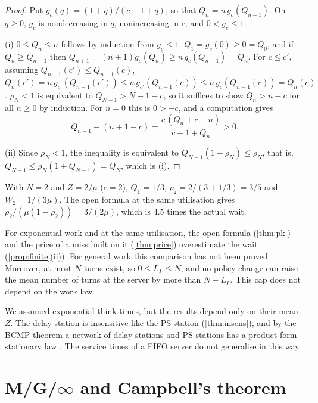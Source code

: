 \begin{proof}
Put $g_c(q)=(1+q)/(c+1+q)$, so that $Q_n=n\,g_c(Q_{n-1})$. On $q\ge0$, $g_c$ is
nondecreasing in $q$, nonincreasing in $c$, and $0<g_c\le1$.

(i) $0\le Q_n\le n$ follows by induction from $g_c\le 1$. $Q_1=g_c(0)\ge0=Q_0$,
and if $Q_n\ge Q_{n-1}$ then $Q_{n+1}=(n+1)g_c(Q_n)\ge n\,g_c(Q_{n-1})=Q_n$.
For $c\le c'$, assuming $Q_{n-1}(c')\le Q_{n-1}(c)$,
$Q_n(c')=n\,g_{c'}(Q_{n-1}(c'))\le n\,g_{c'}(Q_{n-1}(c))\le n\,g_c(Q_{n-1}(c))=Q_n(c)$.
$\rho_N<1$ is equivalent to $Q_{N-1}>N-1-c$, so it suffices to show $Q_n>n-c$ for
all $n\ge0$ by induction. For $n=0$ this is $0>-c$, and a computation gives
\[
  Q_{n+1}-(n+1-c)=\frac{c\,(Q_n+c-n)}{c+1+Q_n}>0 .
\]

(ii) Since $\rho_N<1$, the inequality is equivalent to
$Q_{N-1}(1-\rho_N)\le\rho_N$, that is, $Q_{N-1}\le\rho_N(1+Q_{N-1})=Q_N$, which is
(i).
\end{proof}

\begin{example}\label{L4:ex:two}
With $N=2$ and $Z=2/\mu$ ($c=2$), $Q_1=1/3$, $\rho_2=2/(3+1/3)=3/5$ and
$W_2=1/(3\mu)$. The open formula at the same utilisation gives
$\rho_2/(\mu(1-\rho_2))=3/(2\mu)$, which is $4.5$ times the actual wait.
\end{example}

\begin{remark}
For exponential work and at the same utilisation, the open formula
(\cref{thm:pk}) and the price of a miss built on it (\cref{thm:price})
overestimate the wait (\cref{prop:finite}(ii)). For general work this comparison
has not been proved. Moreover, at most $N$ turns exist, so $0\le L_P\le N$, and no
policy change can raise the mean number of turns at the server by more than
$N-L_P$. This cap does not depend on the work law.
\end{remark}

\begin{remark}
We assumed exponential think times, but the results depend only on their mean
$Z$. The delay station is insensitive like the PS station (\cref{thm:insens}), and
by the BCMP theorem a network of delay stations and PS stations has a
product-form stationary law \cite{bcmp1975}. The service times of a FIFO server
do not generalise in this way.
\end{remark}

\section{M/G/\texorpdfstring{$\infty$}{infinity} and Campbell's theorem}\label{L4:sec:campbell}

